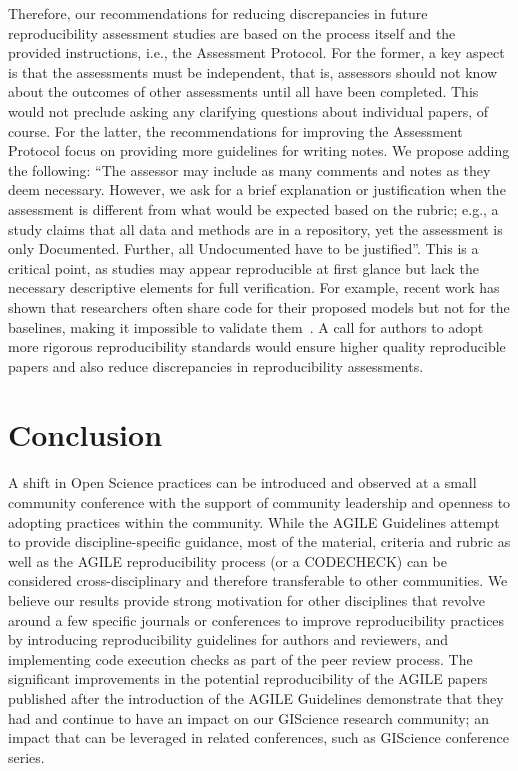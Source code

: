 \documentclass{josis}
\begin{document}
Therefore, our recommendations for reducing discrepancies in future reproducibility assessment studies are based on the process itself and the provided instructions, i.e., the Assessment Protocol. 
For the former, a key aspect is that the assessments must be independent, that is, assessors should not know about the outcomes of other assessments until all have been completed. 
This would not preclude asking any clarifying questions about individual papers, of course. 
For the latter, the recommendations for improving the Assessment Protocol focus on providing more guidelines for writing notes. 
We propose adding the following: ``The assessor may include as many comments and notes as they deem necessary. However, we ask for a brief explanation or justification when the assessment is different from what would be expected based on the rubric; e.g., a study claims that all data and methods are in a repository, yet the assessment is only Documented. Further, all Undocumented have to be justified''. This is a critical point, as studies may appear reproducible at first glance but lack the necessary descriptive elements for full verification. For example, recent work has shown that researchers often share code for their proposed models but not for the baselines, making it impossible to validate them~\cite{shehzad2025}. A call for authors to adopt more rigorous reproducibility standards would ensure higher quality reproducible papers and also reduce discrepancies in reproducibility assessments.

\section{Conclusion}

A shift in Open Science practices can be introduced and observed at a small community conference with the support of community leadership and openness to adopting practices within the community.
While the AGILE Guidelines attempt to provide discipline-specific guidance, most of the material, criteria and rubric as well as the AGILE reproducibility process (or a CODECHECK) can be considered cross-disciplinary and therefore transferable to other communities.
We believe our results provide strong motivation for other disciplines that revolve around a few specific journals or conferences to improve reproducibility practices by introducing reproducibility guidelines for authors and reviewers, and implementing code execution checks as part of the peer review process. The significant improvements in the potential reproducibility of the AGILE papers published after the introduction of the AGILE Guidelines demonstrate that they had and continue to have an impact on our GIScience research community; an impact that can be leveraged in related conferences, such as GIScience conference series.
\end{document}
